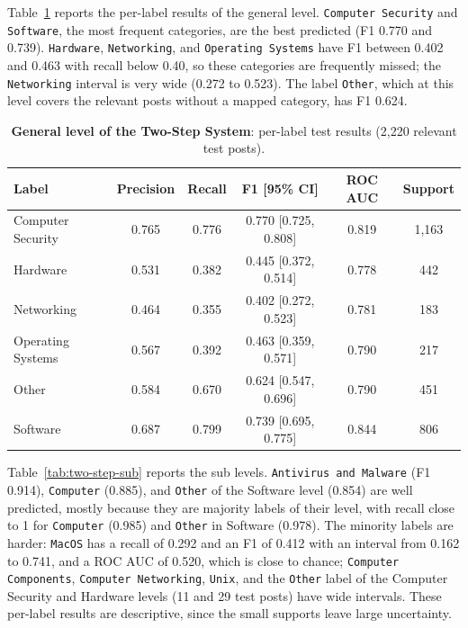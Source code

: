 Table~\ref{tab:two-step-general} reports the per-label results of the general level. \texttt{Computer Security} and \texttt{Software}, the most frequent categories, are the best predicted (F1 0.770 and 0.739). \texttt{Hardware}, \texttt{Networking}, and \texttt{Operating Systems} have F1 between 0.402 and 0.463 with recall below 0.40, so these categories are frequently missed; the \texttt{Networking} interval is very wide (0.272 to 0.523). The label \texttt{Other}, which at this level covers the relevant posts without a mapped category, has F1 0.624.

\begin{table}
    \centering
    \caption{\textbf{General level of the Two-Step System}: per-label test results (2,220 relevant test posts).}
    \label{tab:two-step-general}
    \small
    \begin{tabular}{lccccc}
        \hline
        \textbf{Label} & \textbf{Precision} & \textbf{Recall} & \textbf{F1 [95{\%} CI]} & \textbf{ROC AUC} & \textbf{Support} \\
        \hline
        Computer Security & 0.765 & 0.776 & 0.770 [0.725, 0.808] & 0.819 & 1,163 \\
        Hardware & 0.531 & 0.382 & 0.445 [0.372, 0.514] & 0.778 & 442 \\
        Networking & 0.464 & 0.355 & 0.402 [0.272, 0.523] & 0.781 & 183 \\
        Operating Systems & 0.567 & 0.392 & 0.463 [0.359, 0.571] & 0.790 & 217 \\
        Other & 0.584 & 0.670 & 0.624 [0.547, 0.696] & 0.790 & 451 \\
        Software & 0.687 & 0.799 & 0.739 [0.695, 0.775] & 0.844 & 806 \\
        \hline
    \end{tabular}
\end{table}

Table~\ref{tab:two-step-sub} reports the sub levels. \texttt{Antivirus and Malware} (F1 0.914), \texttt{Computer} (0.885), and \texttt{Other} of the Software level (0.854) are well predicted, mostly because they are majority labels of their level, with recall close to 1 for \texttt{Computer} (0.985) and \texttt{Other} in Software (0.978). The minority labels are harder: \texttt{MacOS} has a recall of 0.292 and an F1 of 0.412 with an interval from 0.162 to 0.741, and a ROC AUC of 0.520, which is close to chance; \texttt{Computer Components}, \texttt{Computer Networking}, \texttt{Unix}, and the \texttt{Other} label of the Computer Security and Hardware levels (11 and 29 test posts) have wide intervals. These per-label results are descriptive, since the small supports leave large uncertainty.

